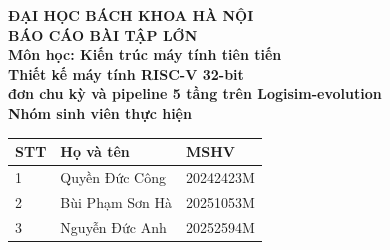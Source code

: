 \documentclass[report.tex]{subfiles}
\begin{document}
\begin{titlepage}
\thispagestyle{empty}
\begin{center}

{\textbf{\large{ĐẠI HỌC BÁCH KHOA HÀ NỘI}}}\\[3cm]

{\textbf{\huge{BÁO CÁO BÀI TẬP LỚN}}}\\[0.5cm]
{\textbf{\large{Môn học: Kiến trúc máy tính tiên tiến}}}\\[1cm]
{\textbf{\Large{Thiết kế máy tính RISC-V 32-bit}}}\\[0.2cm]
{\textbf{\Large{đơn chu kỳ và pipeline 5 tầng trên Logisim-evolution}}}\\[2cm]

{\textbf{\large{Nhóm sinh viên thực hiện}}}\\[0.4cm]
{\large
\begin{tabular}{lll}
STT & Họ và tên & MSHV \\
\hline
1 & Quyền Đức Công & 20242423M \\
2 & Bùi Phạm Sơn Hà & 20251053M \\
3 & Nguyễn Đức Anh & 20252594M \\
\end{tabular}}

\vspace{3cm}
\begin{table}[H]
\centering
{}
\end{table}
\end{center}

\end{titlepage}
\end{document}
